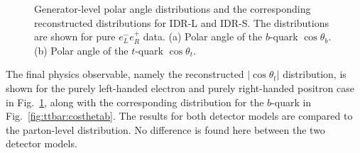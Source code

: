 \begin{figure}[htbp]
\begin{subfigure}{0.475\hsize}
 \caption{  \label{fig:ttbar:costhetat}}
 \end{subfigure}
\caption{Generator-level polar angle distributions and the corresponding reconstructed distributions for IDR-L and IDR-S. The distributions are shown for pure $e^-_L e^+_R$ data.
(a) Polar angle of the $b$-quark $\cos{\theta_b}$. 
(b) Polar angle of the $t$-quark $\cos{\theta_t}$.
}
\label{fig:ttbar:result}
\end{figure}

The final physics observable, namely the reconstructed  $|\cos{\theta_t}|$ distribution, is shown for the purely left-handed electron and purely right-handed positron case in Fig.~\ref{fig:ttbar:costhetat}, along with the corresponding distribution for the $b$-quark in Fig.~\ref{fig:ttbar:costhetab}. The results for both detector models are compared to the parton-level distribution. No difference is found here
between the two detector models.
 
